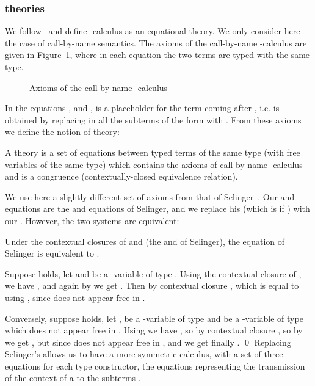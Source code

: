 \documentclass{CSML}
\begin{document}
\subsubsection{\texorpdfstring{}{lambda-mu} theories}
\label{lmtheo}
We follow~\cite{SelingerControl} and define -calculus as an equational theory. We only consider here the case of call-by-name semantics. The axioms of the call-by-name -calculus are given in Figure~\ref{LambdaMuAxioms}, where in each equation the two terms are typed with the same type.
\begin{figure}


\caption{Axioms of the call-by-name -calculus}
\label{LambdaMuAxioms}
\end{figure}
In the equations ,  and ,  is a placeholder for the term coming after , i.e.  is obtained by replacing in  all the subterms of the form  with . From these axioms  we define the notion of  theory:
\begin{defi}[ theory]
A  theory is a set of equations between typed terms of the same type (with free variables of the same type) which contains the axioms of call-by-name -calculus and is a congruence (contextually-closed equivalence relation).
\end{defi}
We use here a slightly different set of axioms from that of Selinger~\cite{SelingerControl}. Our  and  equations are the  and  equations of Selinger, and we replace his  (which is  if ) with our . However, the two systems are equivalent:
\begin{lem}
Under the contextual closures of  and  (the  and  of Selinger), the equation  of Selinger is equivalent to .
\end{lem}
\proof
Suppose  holds, let  and  be a -variable of type . Using the contextual closure of , we have , and again by  we get . Then by contextual closure , which is equal to  using , since  does not appear free in .\par
Conversely, suppose  holds, let ,  be a -variable of type  and  be a -variable of type  which does not appear free in . Using  we have , so by contextual closure , so by  we get , but  since  does not appear free in , and we get finally .
\qed
Replacing Selinger's  allows us to have a more symmetric calculus, with a set of three equations for each type constructor, the  equations representing the transmission of the context of a  to the subterms .
\end{document}
